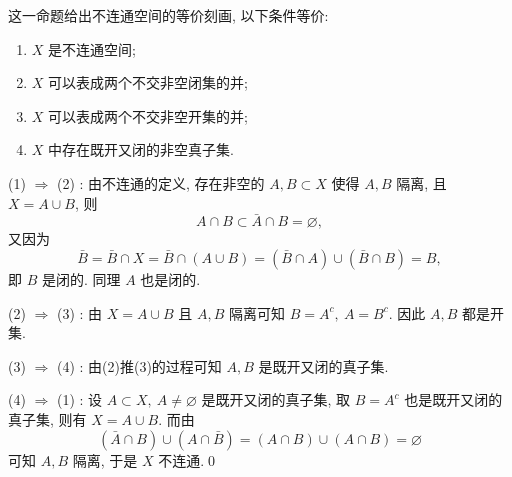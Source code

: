     \begin{Proposition}\label{prop:不连通空间的等价刻画}
        这一命题给出不连通空间的等价刻画, 以下条件等价:
        \begin{enumerate}
            \item $ X $ 是不连通空间;
            \item $ X $ 可以表成两个不交非空闭集的并;
            \item $ X $ 可以表成两个不交非空开集的并;
            \item $ X $ 中存在既开又闭的非空真子集.
        \end{enumerate}
    \end{Proposition}
    \begin{Proof}
        (1) $ \Rightarrow $ (2) : 由不连通的定义, 存在非空的 $ A, B\subset X $ 使得 $ A, B $ 隔离, 且 $ X=A\cup B $, 则
        \[
            A\cap B\subset\bar{A}\cap B=\varnothing,
        \]
        又因为
        \[
            \bar{B}=\bar{B}\cap X=\bar{B}\cap(A\cup B)=(\bar{B}\cap A)\cup(\bar{B}\cap B)=B,
        \]
        即 $ B $ 是闭的. 同理 $ A $ 也是闭的.

        (2) $ \Rightarrow $ (3) : 由 $ X=A\cup B $ 且 $ A, B $ 隔离可知 $ B=A^c,\ A=B^c $. 因此 $ A, B $ 都是开集.

        (3) $ \Rightarrow $ (4) : 由(2)推(3)的过程可知 $ A, B $ 是既开又闭的真子集.

        (4) $ \Rightarrow $ (1) : 设 $ A\subset X,\ A\ne\varnothing $ 是既开又闭的真子集, 取 $ B=A^c $ 也是既开又闭的真子集, 则有 $ X=A\cup B $. 而由
        \[
            (\bar{A}\cap B)\cup(A\cap\bar{B})=(A\cap B)\cup(A\cap B)=\varnothing
        \]
        可知 $ A, B $ 隔离, 于是 $ X $ 不连通.\qed
    \end{Proof}

